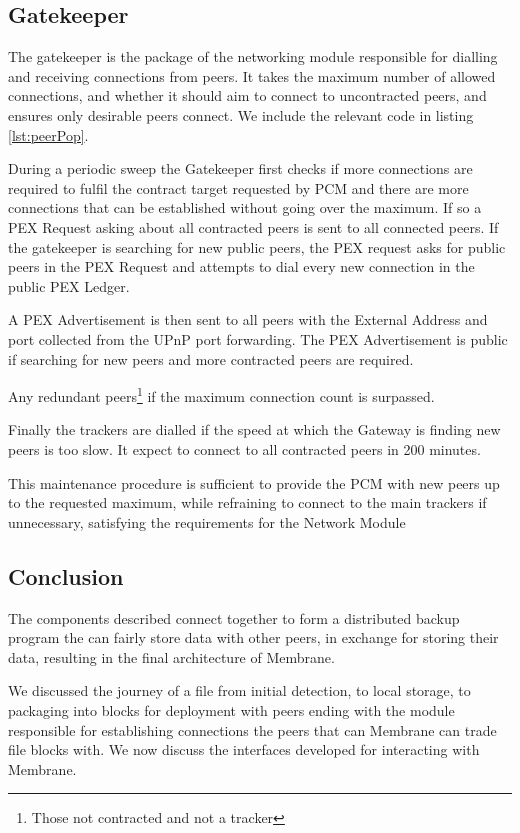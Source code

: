 \documentclass[11pt, a4paper, twocolumn, twoside]{report}
\begin{document}
\subsection{Gatekeeper}

The gatekeeper is the package of the networking module responsible for dialling and receiving connections from peers. It takes the maximum number of allowed connections, and whether it should aim to connect to uncontracted peers, and ensures only desirable peers connect. We include the relevant code in listing \ref{lst:peerPop}.

During a periodic sweep the Gatekeeper first checks if more connections are required to fulfil the contract target requested by PCM and there are more connections that can be established without going over the maximum. If so a PEX Request asking about all contracted peers is sent to all connected peers. If the gatekeeper is searching for new public peers, the PEX request asks for public peers in the PEX Request and attempts to dial every new connection in the public PEX Ledger.

A PEX Advertisement is then sent to all peers with the External Address and port collected from the UPnP port forwarding. The PEX Advertisement is public if searching for new peers and more contracted peers are required.

Any redundant peers\footnote{Those not contracted and not a tracker} if the maximum connection count is surpassed.

Finally the trackers are dialled if the speed at which the Gateway is finding new peers is too slow. It expect to connect to all contracted peers in 200 minutes.

This maintenance procedure is sufficient to provide the PCM with new peers up to the requested maximum, while refraining to connect to the main trackers if unnecessary, satisfying the requirements for the Network Module

\subsection{Conclusion}

The components described connect together to form a distributed backup program the can fairly store data with other peers, in exchange for storing their data, resulting in the final architecture of Membrane.

We discussed the journey of a file from initial detection, to local storage, to packaging into blocks for deployment with peers ending with the module responsible for establishing connections the peers that can Membrane can trade file blocks with. We now discuss the interfaces developed for interacting with Membrane.
\end{document}
